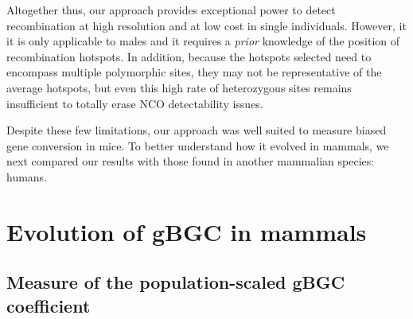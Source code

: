 


Altogether thus, our approach provides exceptional power to detect recombination at high resolution and at low cost in single individuals.
However, it it is only applicable to males and it requires a \textit{prior} knowledge of the position of recombination hotspots.
In addition, because the hotspots selected need to encompass multiple polymorphic sites, they may not be representative of the average hotspots, but even this high rate of heterozygous sites remains insufficient to totally erase NCO detectability issues.

Despite these few limitations, our approach was well suited to measure biased gene conversion in mice. 
To better understand how it evolved in mammals, we next compared our results with those found in another mammalian species: humans.


\section{Evolution of gBGC in mammals}
\subsection{Measure of the population-scaled gBGC coefficient}



